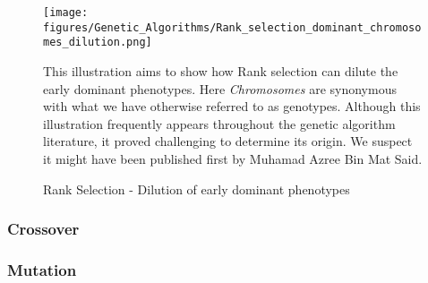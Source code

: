 \begin{figure}[H]
    \centering
    \texttt{[image: figures/Genetic\_Algorithms/Rank\_selection\_dominant\_chromosomes\_dilution.png]}
    \caption{Rank Selection - Dilution of early dominant phenotypes}
    \small
    \raggedright
    This illustration aims to show how Rank selection can dilute the early dominant phenotypes. Here \textit{Chromosomes} are synonymous with what we have otherwise referred to as genotypes. Although this illustration frequently appears throughout the genetic algorithm literature, it proved challenging to determine its origin. We suspect it might have been published first by Muhamad Azree Bin Mat Said\cite{Rank-Selection-Illustration-Origin}. 
    \label{fig:GA_Rank_Selection}
\end{figure}

\subsubsection{Crossover}\label{subsubsec:Crossover}

\subsubsection{Mutation}